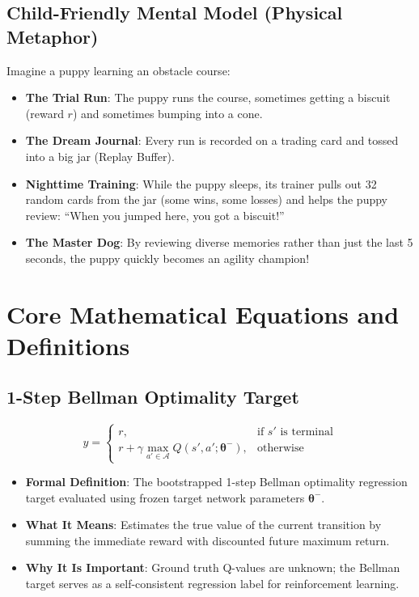 \documentclass[11pt,a4paper]{article}
\theoremstyle{definition}
\begin{document}
\subsection{Child-Friendly Mental Model (Physical Metaphor)}
Imagine a puppy learning an obstacle course:
\begin{itemize}
    \item \textbf{The Trial Run}: The puppy runs the course, sometimes getting a biscuit (reward $r$) and sometimes bumping into a cone.
    \item \textbf{The Dream Journal}: Every run is recorded on a trading card and tossed into a big jar (Replay Buffer).
    \item \textbf{Nighttime Training}: While the puppy sleeps, its trainer pulls out 32 random cards from the jar (some wins, some losses) and helps the puppy review: ``When you jumped here, you got a biscuit!''
    \item \textbf{The Master Dog}: By reviewing diverse memories rather than just the last 5 seconds, the puppy quickly becomes an agility champion!
\end{itemize}

\section{Core Mathematical Equations and Definitions}

\subsection{1-Step Bellman Optimality Target}
{\boldmath
\begin{equation}
y = 
\begin{cases}
r, & \text{if } s' \text{ is terminal} \\
r + \gamma \max_{a' \in \mathcal{A}} Q(s', a'; \boldsymbol{\theta}^-), & \text{otherwise}
\end{cases}
\end{equation}
}
\begin{itemize}
    \item \textbf{Formal Definition}: The bootstrapped 1-step Bellman optimality regression target evaluated using frozen target network parameters $\boldsymbol{\theta}^-$.
    \item \textbf{What It Means}: Estimates the true value of the current transition by summing the immediate reward with discounted future maximum return.
    \item \textbf{Why It Is Important}: Ground truth Q-values are unknown; the Bellman target serves as a self-consistent regression label for reinforcement learning.
\end{itemize}
\end{document}
